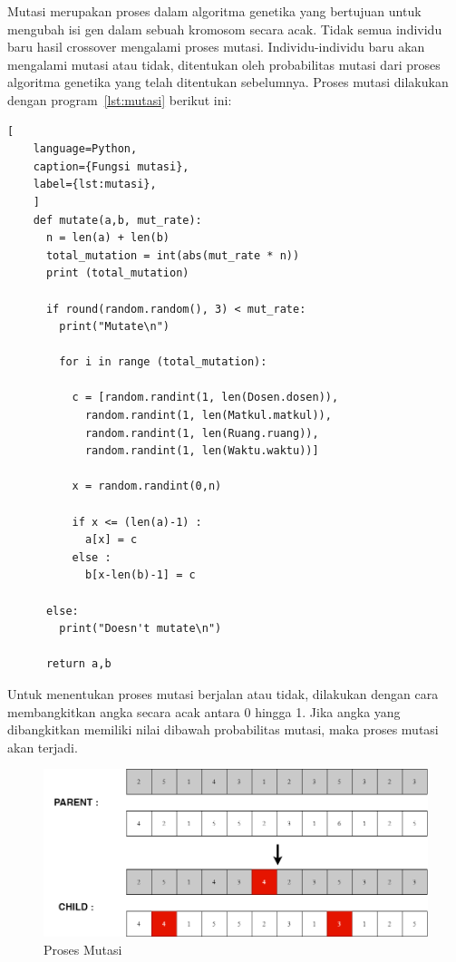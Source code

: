   Mutasi merupakan proses dalam algoritma genetika yang bertujuan untuk mengubah \linebreak isi gen dalam sebuah kromosom secara acak. 
  Tidak semua individu baru hasil crossover \linebreak mengalami proses mutasi. 
  Individu-individu baru akan mengalami mutasi atau tidak, \linebreak ditentukan oleh probabilitas mutasi dari proses algoritma genetika yang telah ditentukan sebelumnya. 
  Proses mutasi dilakukan dengan program~\ref{lst:mutasi} berikut ini:
  \begin{lstlisting}[
    language=Python,
    caption={Fungsi mutasi},
    label={lst:mutasi},
    ]
    def mutate(a,b, mut_rate):
      n = len(a) + len(b)
      total_mutation = int(abs(mut_rate * n))
      print (total_mutation)

      if round(random.random(), 3) < mut_rate:
        print("Mutate\n")

        for i in range (total_mutation):

          c = [random.randint(1, len(Dosen.dosen)),
            random.randint(1, len(Matkul.matkul)),
            random.randint(1, len(Ruang.ruang)),
            random.randint(1, len(Waktu.waktu))]

          x = random.randint(0,n)

          if x <= (len(a)-1) :
            a[x] = c
          else :
            b[x-len(b)-1] = c

      else:
        print("Doesn't mutate\n")

      return a,b  
  \end{lstlisting}
  Untuk menentukan proses mutasi berjalan atau tidak, dilakukan dengan cara membangkitkan angka secara acak antara 0 hingga 1. 
  Jika angka yang dibangkitkan memiliki nilai dibawah probabilitas mutasi, maka proses mutasi akan terjadi.
  \begin{figure} [ht] \centering
    \includegraphics[scale=0.4]{gambar/mutation.png}
    \caption{Proses Mutasi}
    \label{fig:mutate}
  \end{figure}

